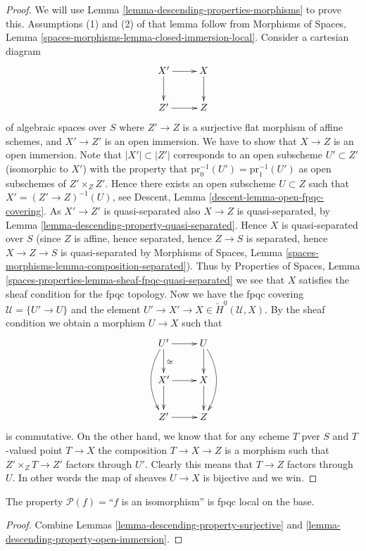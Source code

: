 \begin{proof}
We will use
Lemma \ref{lemma-descending-properties-morphisms}
to prove this. Assumptions (1) and (2) of that lemma follow from
Morphisms of Spaces,
Lemma \ref{spaces-morphisms-lemma-closed-immersion-local}.
Consider a cartesian diagram
$$
\xymatrix{
X' \ar[r] \ar[d] & X \ar[d] \\
Z' \ar[r] & Z
}
$$
of algebraic spaces over $S$
where $Z' \to Z$ is a surjective flat morphism of affine schemes,
and $X' \to Z'$ is an open immersion. We have to show that $X \to Z$
is an open immersion. Note that $|X'| \subset |Z'|$ corresponds to an
open subscheme $U' \subset Z'$ (isomorphic to $X'$)
with the property that $\text{pr}_0^{-1}(U') = \text{pr}_1^{-1}(U')$
as open subschemes of $Z' \times_Z Z'$. Hence there exists an open
subscheme $U \subset Z$ such that $X' = (Z' \to Z)^{-1}(U)$, see
Descent, Lemma \ref{descent-lemma-open-fpqc-covering}.
As $X' \to Z'$ is quasi-separated also $X \to Z$ is quasi-separated, by
Lemma \ref{lemma-descending-property-quasi-separated}.
Hence $X$ is quasi-separated over $S$ (since $Z$ is affine, hence separated,
hence $Z \to S$ is separated, hence $X \to Z \to S$ is quasi-separated by
Morphisms of Spaces, Lemma \ref{spaces-morphisms-lemma-composition-separated}).
Thus by
Properties of Spaces,
Lemma \ref{spaces-properties-lemma-sheaf-fpqc-quasi-separated}
we see that $X$ satisfies the sheaf condition for the fpqc topology.
Now we have the fpqc covering $\mathcal{U} = \{U' \to U\}$
and the element $U' \to X' \to X \in \check{H}^0(\mathcal{U}, X)$.
By the sheaf condition we obtain a morphism $U \to X$ such that
$$
\xymatrix{
U' \ar[r] \ar[d]^{\cong} \ar@/_3ex/[dd] & U \ar[d] \ar@/^3ex/[dd] \\
X' \ar[r] \ar[d] & X \ar[d] \\
Z' \ar[r] & Z
}
$$
is commutative. On the other hand, we know that for any scheme $T$ pver $S$
and $T$-valued point $T \to X$ the composition $T \to X \to Z$ is a
morphism such that $Z' \times_Z T \to Z'$ factors through $U'$. Clearly
this means that $T \to Z$ factors through $U$. In other words the map
of sheaves $U \to X$ is bijective and we win.
\end{proof}

\begin{lemma}
\label{lemma-descending-property-isomorphism}
The property $\mathcal{P}(f) =$``$f$ is an isomorphism''
is fpqc local on the base.
\end{lemma}

\begin{proof}
Combine Lemmas \ref{lemma-descending-property-surjective}
and \ref{lemma-descending-property-open-immersion}.
\end{proof}

